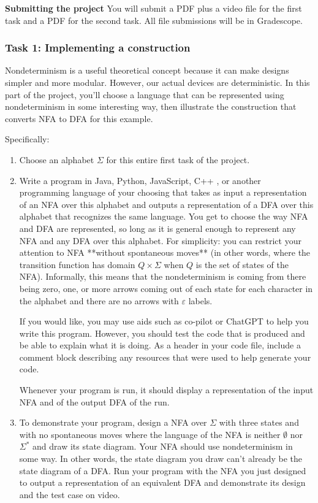 \documentclass[12pt, oneside]{article}
\begin{document}
{\bf Submitting the project} You will submit a PDF plus a video file for the first task and a PDF for the 
second task. All file submissions will be in Gradescope.

\newpage
\subsubsection*{Task 1: Implementing a construction}

Nondeterminism is a useful theoretical concept because it can make designs simpler and more modular. 
However, our actual devices are deterministic. In this part of the project, you'll choose a 
language that can be represented using nondeterminism in some interesting way, then illustrate
the construction that converts NFA to DFA for this example.

Specifically:

\begin{enumerate}
\item Choose an alphabet $\Sigma$ for this entire first task of the project.
\item Write a program in Java, Python, JavaScript, C++ , or another programming language of your choosing
 that takes as input a representation of an NFA over this alphabet and outputs
 a representation of a DFA over this alphabet that recognizes the same language. 
 You get to choose the way NFA and DFA are represented, so long as it is
 general enough to represent any NFA and any DFA over this alphabet. For simplicity: you can 
 restrict your attention to NFA **without spontaneous moves** (in other words, where the transition function 
 has domain $Q \times \Sigma$ when $Q$ is the set of states of the NFA). Informally, this means
 that the nondeterminism is coming from there being zero, one, or more arrows coming out of each state
 for each character in the alphabet and there are no arrows with $\varepsilon$ labels.

 If you would like, you may use aids such as co-pilot or ChatGPT to help you write this program. 
 However, you should test the code that is produced and be able to explain what it is doing. 
 As a header in your code file, include a comment block describing any resources that were used to 
 help generate your code.

 Whenever your program is run, it should display a representation of the input NFA and 
 of the output DFA of the run.

\item To demonstrate your program, design a NFA over $\Sigma$ with three states and with no spontaneous moves 
where the language of the NFA is neither $\emptyset$ nor $\Sigma^*$ and draw its state diagram.
Your NFA should use nondeterminism in some way. In other words, the state diagram you draw can't 
already be the state diagram of a DFA. Run your program with the NFA you just designed to output a 
representation of an equivalent DFA and
demonstrate its design and the test case on video.

\end{enumerate}
\end{document}
